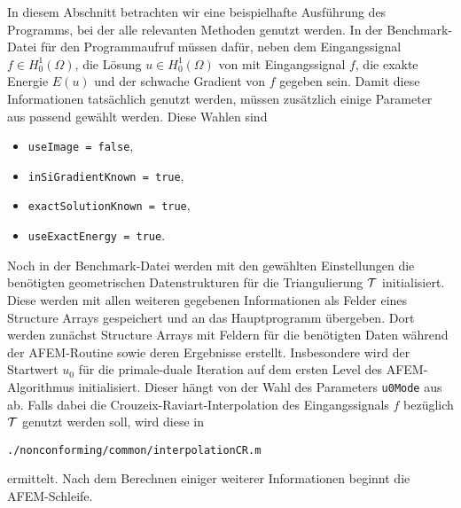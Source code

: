In diesem Abschnitt betrachten wir eine beispielhafte Ausführung des Programms,
bei der alle relevanten Methoden genutzt werden.
In der Benchmark-Datei für den Programmaufruf müssen dafür, neben dem
Eingangssignal $f\in H^1_0(\Omega)$, die Lösung $u\in H^1_0(\Omega)$ von
 mit Eingangssignal $f$, die exakte Energie $E(u)$
und der schwache Gradient von $f$ gegeben sein. 
Damit diese Informationen tatsächlich genutzt werden, müssen zusätzlich einige
Parameter aus  passend gewählt werden. 
Diese Wahlen sind
\begin{itemize}
  \item \texttt{useImage = false},
  \item \texttt{inSiGradientKnown = true},
  \item \texttt{exactSolutionKnown = true},
  \item \texttt{useExactEnergy = true}.
\end{itemize}
Noch in der Benchmark-Datei werden mit den gewählten Einstellungen die
benötigten geometrischen Datenstrukturen für die Triangulierung $\mathcal{T}$
initialisiert. 
Diese werden mit allen weiteren gegebenen Informationen als Felder eines
Structure Arrays gespeichert und an das Hauptprogramm übergeben. 
Dort werden zunächst Structure Arrays mit Feldern für die benötigten Daten
während der AFEM-Routine sowie deren Ergebnisse erstellt. 
Insbesondere wird der Startwert $u_0$ für die primale-duale Iteration
auf dem ersten Level des AFEM-Algorithmus initialisiert. 
Dieser hängt von der Wahl des Parameters \texttt{u0Mode} aus
 ab.
Falls dabei die Crouzeix-Raviart-Interpolation des Eingangssignals $f$ 
bezüglich $\mathcal{T}$ genutzt werden soll, wird diese in
\begin{center}
  \texttt{./nonconforming/common/interpolationCR.m}
\end{center}
ermittelt.
Nach dem Berechnen einiger weiterer Informationen beginnt die AFEM-Schleife.

